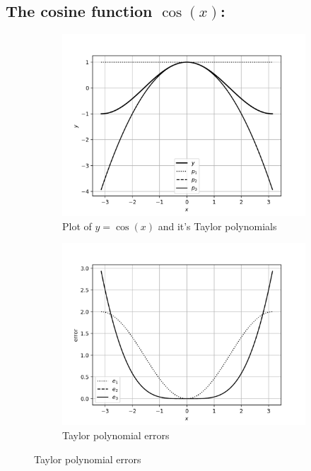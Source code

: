 \documentclass[12,a4paper]{article}
\begin{document}
    \subsection{The cosine function $\cos(x)$:}
    \begin{figure}[H]
        \centering
        \begin{subfigure}[t]{0.49\textwidth}
            \includegraphics[width=\textwidth]{plots/q1p7.png}
            \caption{Plot of $y=\cos(x)$ and it's Taylor polynomials}
            \label{fig:q3a}
        \end{subfigure}
        \begin{subfigure}[t]{0.49\textwidth}
            \includegraphics[width=\textwidth]{plots/q1p8.png}
            \caption{Taylor polynomial errors}
            \label{fig:q3b}
        \end{subfigure}
    \end{figure}
\end{document}
